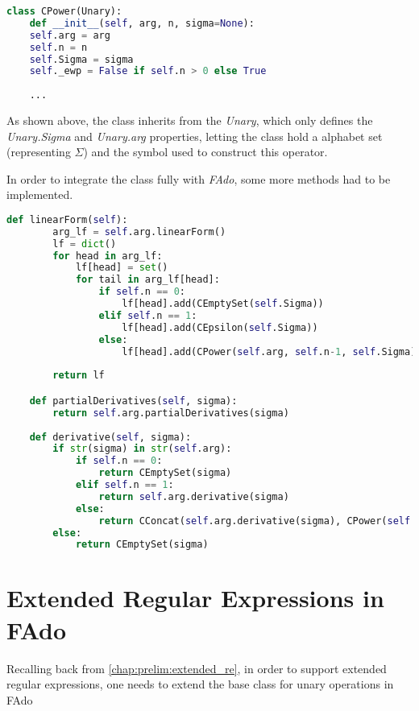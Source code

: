\begin{lstlisting}[language=Python]
class CPower(Unary):
	def __init__(self, arg, n, sigma=None):
	self.arg = arg
	self.n = n
	self.Sigma = sigma
	self._ewp = False if self.n > 0 else True
	
	...
\end{lstlisting}

As shown above, the class inherits from the \textit{Unary}, which only defines the \textit{Unary.Sigma} and \textit{Unary.arg} properties, letting the class hold a alphabet set (representing $\Sigma$) and the symbol used to construct this operator.

In order to integrate the class fully with \textit{FAdo}, some more methods had to be implemented.

\begin{lstlisting}[language=Python]
	def linearForm(self):
		arg_lf = self.arg.linearForm()
		lf = dict()
		for head in arg_lf:
			lf[head] = set()
			for tail in arg_lf[head]:
				if self.n == 0:
					lf[head].add(CEmptySet(self.Sigma))
				elif self.n == 1:
					lf[head].add(CEpsilon(self.Sigma))
				else:
					lf[head].add(CPower(self.arg, self.n-1, self.Sigma))
	
		return lf

	def partialDerivatives(self, sigma):
		return self.arg.partialDerivatives(sigma)
	
	def derivative(self, sigma):
		if str(sigma) in str(self.arg):
			if self.n == 0:
				return CEmptySet(sigma)
			elif self.n == 1:
				return self.arg.derivative(sigma)
			else:
				return CConcat(self.arg.derivative(sigma), CPower(self.arg, self.n-1, self.Sigma))
		else:
			return CEmptySet(sigma)
\end{lstlisting}



\section{Extended Regular Expressions in FAdo}
Recalling back from \ref{chap:prelim:extended_re}, in order to support extended regular expressions, one needs to extend the base class for unary operations in FAdo